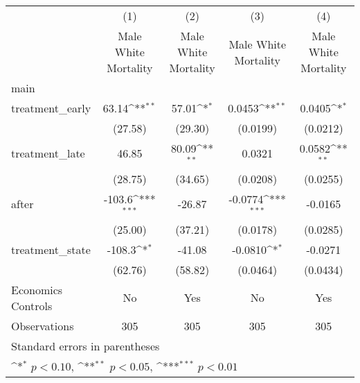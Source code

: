 {
\def\sym#1{\ifmmode^{#1}\else\(^{#1}\)\fi}
\begin{longtable}{l*{4}{c}}
\hline\hline\endfirsthead\hline\endhead\hline\endfoot\endlastfoot
                    &\multicolumn{1}{c}{(1)}&\multicolumn{1}{c}{(2)}&\multicolumn{1}{c}{(3)}&\multicolumn{1}{c}{(4)}\\
                    &\multicolumn{1}{c}{Male White Mortality}&\multicolumn{1}{c}{Male White Mortality}&\multicolumn{1}{c}{Male White Mortality}&\multicolumn{1}{c}{Male White Mortality}\\
\hline
main                &                     &                     &                     &                     \\
treatment\_early     &       63.14\sym{**} &       57.01\sym{*}  &      0.0453\sym{**} &      0.0405\sym{*}  \\
                    &     (27.58)         &     (29.30)         &    (0.0199)         &    (0.0212)         \\
[1em]
treatment\_late      &       46.85         &       80.09\sym{**} &      0.0321         &      0.0582\sym{**} \\
                    &     (28.75)         &     (34.65)         &    (0.0208)         &    (0.0255)         \\
[1em]
after               &      -103.6\sym{***}&      -26.87         &     -0.0774\sym{***}&     -0.0165         \\
                    &     (25.00)         &     (37.21)         &    (0.0178)         &    (0.0285)         \\
[1em]
treatment\_state     &      -108.3\sym{*}  &      -41.08         &     -0.0810\sym{*}  &     -0.0271         \\
                    &     (62.76)         &     (58.82)         &    (0.0464)         &    (0.0434)         \\
[1em]
Economics Controls  &          No         &         Yes         &          No         &         Yes         \\
\hline
Observations        &         305         &         305         &         305         &         305         \\
\hline\hline
\multicolumn{5}{l}{\footnotesize Standard errors in parentheses}\\
\multicolumn{5}{l}{\footnotesize \sym{*} \(p<0.10\), \sym{**} \(p<0.05\), \sym{***} \(p<0.01\)}\\
\end{longtable}
}
